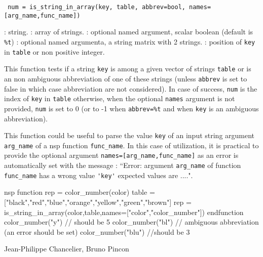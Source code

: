 
\begin{mandesc}
\end{mandesc}
\begin{calling_sequence}
\begin{verbatim}
 num = is_string_in_array(key, table, abbrev=bool, names=[arg_name,func_name])  
\end{verbatim}
\end{calling_sequence}
\begin{parameters}
  \begin{varlist}
    : string.
    : array of strings.
    : optional named argument, scalar boolean (default is \verb+%t+)
    : optional named argumenta, a string matrix with 2 strings.
    : position of \verb+key+ in \verb+table+ or non positive integer.
  \end{varlist}
\end{parameters}
\begin{mandescription}
  This function tests if a string \verb+key+ is among a given vector of strings \verb+table+
 or is an non ambiguous abbreviation of one of these strings (unless \verb+abbrev+ 
 is set to false in which case abbreviation are not considered). In case of success, 
 \verb+num+ is the index of \verb+key+ in  \verb+table+ otherwise, when the optional
 \verb+names+ argument is not provided, \verb+num+ is set to 0 
 (or to -1 when \verb+abbrev=%t+ and when \verb+key+ is an ambiguous abbreviation).
 
  This function could be useful to parse the value \verb+key+ of an input string argument 
 \verb+arg_name+ of a nsp function  \verb+func_name+. In this case of utilization, it is
 practical to provide the optional argument \verb+names=[arg_name,func_name]+ as an error 
 is automatically set with the message : ``Error:  argument \verb+arg_name+ of function  
\verb+func_name+  has a wrong value \verb+'key'+ expected values are ....".

\end{mandescription}
\begin{examples}
\begin{mintednsp}{nsp}
function rep = color_number(color)
   table = ["black","red","blue","orange","yellow","green","brown"]
   rep = is_string_in_array(color,table,names=["color","color_number"])
endfunction
color_number("y") // should be 5
color_number("bl") // ambiguous abbreviation (an error should be set)
color_number("blu") //should be 3
\end{mintednsp}
\end{examples}

\begin{manseealso}
\end{manseealso}

\begin{authors}
  Jean-Philippe Chancelier, Bruno Pincon
\end{authors}


